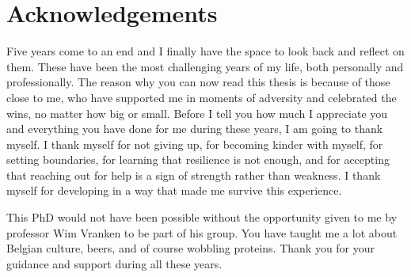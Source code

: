 \chapter*{Acknowledgements}

Five years come to an end and I finally have the space to look back and reflect on them. These have been the most challenging years of my life, both personally and professionally. The reason why you can now read this thesis is because of those close to me, who have supported me in moments of adversity and celebrated the wins, no matter how big or small. Before I tell you how much I appreciate you and everything you have done for me during these years, I am going to thank myself. I thank myself for not giving up, for becoming kinder with myself, for setting boundaries, for learning that resilience is not enough, and for accepting that reaching out for help is a sign of strength rather than weakness. I thank myself for developing in a way that made me survive this experience. 

This PhD would not have been possible without the opportunity given to me by professor Wim Vranken to be part of his group. You have taught me a lot about Belgian culture, beers, and of course wobbling proteins. Thank you for your guidance and support during all these years.

